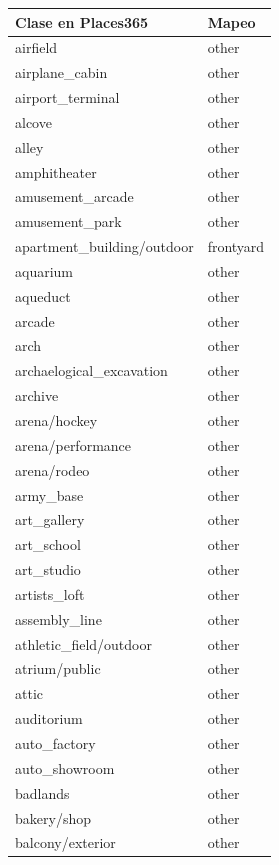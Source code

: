 \begin{table}[h!]
	\centering
	\begin{tabular}{| l | l |}
		\toprule
		Clase en Places365 &       Mapeo \\
		\midrule
		airfield &        other \\
		airplane\_cabin &        other \\
		airport\_terminal &        other \\
		alcove &        other \\
		alley &        other \\
		amphitheater &        other \\
		amusement\_arcade &        other \\
		amusement\_park &        other \\
		apartment\_building/outdoor &    frontyard \\
		aquarium &        other \\
		aqueduct &        other \\
		arcade &        other \\
		arch &        other \\
		archaelogical\_excavation &        other \\
		archive &        other \\
		arena/hockey &        other \\
		arena/performance &        other \\
		arena/rodeo &        other \\
		army\_base &        other \\
		art\_gallery &        other \\
		art\_school &        other \\
		art\_studio &        other \\
		artists\_loft &        other \\
		assembly\_line &        other \\
		athletic\_field/outdoor &        other \\
		atrium/public &        other \\
		attic &        other \\
		auditorium &        other \\
		auto\_factory &        other \\
		auto\_showroom &        other \\
		badlands &        other \\
		bakery/shop &        other \\
		balcony/exterior &        other \\

\end{tabular}
\end{table}
